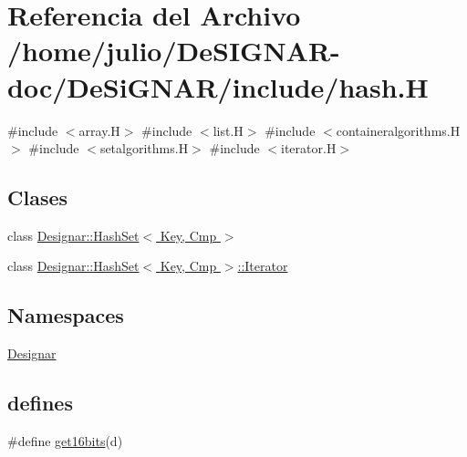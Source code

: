 \hypertarget{hash_8_h}{}\section{Referencia del Archivo /home/julio/\+De\+S\+I\+G\+N\+A\+R-\/doc/\+De\+Si\+G\+N\+A\+R/include/hash.H}
\label{hash_8_h}
{\ttfamily \#include $<$array.\+H$>$}\newline
{\ttfamily \#include $<$list.\+H$>$}\newline
{\ttfamily \#include $<$containeralgorithms.\+H$>$}\newline
{\ttfamily \#include $<$setalgorithms.\+H$>$}\newline
{\ttfamily \#include $<$iterator.\+H$>$}\newline
\subsection*{Clases}
\begin{DoxyCompactItemize}
\item 
class \hyperlink{class_designar_1_1_hash_set}{Designar\+::\+Hash\+Set$<$ Key, Cmp $>$}
\item 
class \hyperlink{class_designar_1_1_hash_set_1_1_iterator}{Designar\+::\+Hash\+Set$<$ Key, Cmp $>$\+::\+Iterator}
\end{DoxyCompactItemize}
\subsection*{Namespaces}
\begin{DoxyCompactItemize}
\item 
 \hyperlink{namespace_designar}{Designar}
\end{DoxyCompactItemize}
\subsection*{defines}
\begin{DoxyCompactItemize}
\item 
\#define \hyperlink{hash_8_h_abc7d71657be8975a51684e41029b7964}{get16bits}(d)
\end{DoxyCompactItemize}
